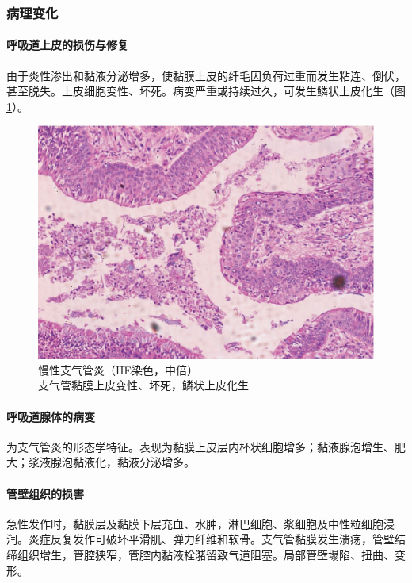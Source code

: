 \subsubsection{病理变化}

\paragraph{呼吸道上皮的损伤与修复}
由于炎性渗出和黏液分泌增多，使黏膜上皮的纤毛因负荷过重而发生粘连、倒伏，甚至脱失。上皮细胞变性、坏死。病变严重或持续过久，可发生鳞状上皮化生（图\ref{fig7-1}）。

\begin{figure}[!htbp]
 \centering
 \includegraphics{./images/Image00110.jpg}
 \captionsetup{justification=centering}
 \caption{慢性支气管炎（HE染色，中倍）\\ {\small 支气管黏膜上皮变性、坏死，鳞状上皮化生}}
\label{fig7-1}
  \end{figure}

\paragraph{呼吸道腺体的病变}
为支气管炎的形态学特征。表现为黏膜上皮层内杯状细胞增多；黏液腺泡增生、肥大；浆液腺泡黏液化，黏液分泌增多。

\paragraph{管壁组织的损害}
急性发作时，黏膜层及黏膜下层充血、水肿，淋巴细胞、浆细胞及中性粒细胞浸润。炎症反复发作可破坏平滑肌、弹力纤维和软骨。支气管黏膜发生溃疡，管壁结缔组织增生，管腔狭窄，管腔内黏液栓潴留致气道阻塞。局部管壁塌陷、扭曲、变形。

